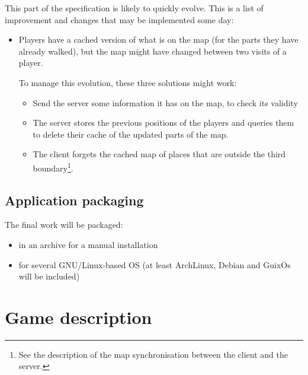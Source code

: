 \documentclass{article}
\begin{document}
This part of the specification is likely to quickly evolve. This is a list of
improvement and changes that may be implemented some day:
\begin{itemize}
	\item Players have a cached version of what is on the map (for the parts
	they have already walked), but the map might have changed between two visits
	of a player.

	To manage this evolution, these three solutions might work:
	\begin{itemize}
	\item Send the server some information it has on the map, to check its
	validity
	\item The server stores the previous positions of the players and queries
	them to delete their cache of the updated parts of the map.
	\item The client forgets the cached map of places that are outside the
	third boundary\footnote{See the description of the map synchronisation
	between the client and the server.}.
	\end{itemize}
\end{itemize}

\subsection{Application packaging}

The final work will be packaged:
\begin{itemize}
	\item in an archive for a manual installation
	\item for several GNU/Linux-based OS
	(at least ArchLinux, Debian and GuixOs will be included)
\end{itemize}



\section{Game description}
\end{document}
